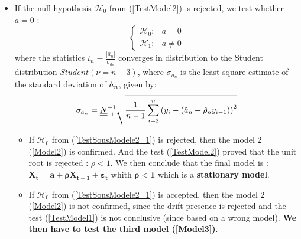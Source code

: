 \begin{itemize}
\item If the null hypothesis  $\mathcal{H}_0$  from (\ref{TestModel2}) is rejected, we test whether $a=0$  :
  \begin{equation}\label{TestSousModele2_1}
    \left\{
    \begin{array}{lr}
      \mathcal{H}_0 :  & a = 0 \\
      \mathcal{H}_1 : & a \neq 0
    \end{array}
    \right.
  \end{equation}
  where the statistics $t_n = \frac{|\hat{a}_n|}{\sigma_{a_n}}$  converges in distribution to the Student distribution $Student(\nu=n-3)$, where $\sigma_{a_n}$ is the least square estimate of the standard deviation of $\Hat{a}_n$, given by:
  \begin{equation}
    \sigma_{a_n}={\underline{\underline{N}}}^{-1}_{11}\sqrt{\frac{1}{n-1}\sum_{i=2}^n\left(y_{i}-(\hat{a}_n+\hat{\rho}_ny_{i-1})\right)^2}
  \end{equation}

  \begin{itemize}
  \item If $\mathcal{H}_0$  from (\ref{TestSousModele2_1}) is rejected, then the model 2 (\ref{Model2}) is confirmed.  And the  test (\ref{TestModel2}) proved that the unit root is rejected : $ \rho < 1$. We then conclude that the final model is : $\boldsymbol{X_t = a +  \rho X_{t-1} + \varepsilon_{t}}$ whith $\boldsymbol{\rho < 1}$ which is a  {\bf stationary model}.
  \item  If $\mathcal{H}_0$  from (\ref{TestSousModele2_1}) is accepted, then the model 2 (\ref{Model2}) is not confirmed, since the drift presence is rejected and the test (\ref{TestModel1}) is not conclusive (since based on a wrong model). {\bf We then have to test the third  model (\ref{Model3})}.
  \end{itemize}


\end{itemize}
